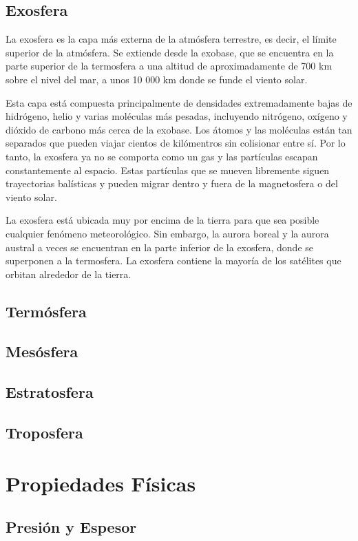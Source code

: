 \documentclass[12pt]{article}
\begin{document}
\subsection{Exosfera}

La exosfera es la capa más externa de la atmósfera terrestre, es decir, el límite superior de la atmósfera. Se extiende desde la exobase, que se encuentra en la parte superior de la termosfera a una altitud de aproximadamente de 700 km sobre el nivel del mar, a unos 10 000 km donde se funde el viento solar.

Esta capa está compuesta principalmente de densidades extremadamente bajas de hidrógeno, helio y varias moléculas más pesadas, incluyendo nitrógeno, oxígeno y dióxido de carbono más cerca de la exobase. Los átomos y las moléculas están tan separados que pueden viajar cientos de kilómentros sin colisionar entre sí. Por lo tanto, la exosfera ya no se comporta como un gas y las partículas escapan constantemente al espacio. Estas partículas que se mueven libremente siguen trayectorias balísticas y pueden migrar dentro y fuera de la magnetosfera o del viento solar.

La exosfera está ubicada muy por encima de la tierra para que sea posible cualquier fenómeno meteorológico. Sin embargo, la aurora boreal y la aurora austral a veces se encuentran en la parte inferior de la exosfera, donde se superponen a la termosfera. La exosfera contiene la mayoría de los satélites que orbitan alrededor de la tierra.

\subsection{Termósfera}
\subsection{Mesósfera}
\subsection{Estratosfera}
\subsection{Troposfera}

\section{Propiedades Físicas}
\subsection{Presión y Espesor}
\end{document}
